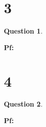 \documentclass{article}
\newtheorem{question}{Question}
\begin{document}
\break

\section*{3}
\begin{myBox}[]{}
    \begin{question}
        
    \end{question}
\end{myBox}

\textbf{Pf:}

\break

\section*{4}
\begin{myBox}[]{}
    \begin{question}
        
    \end{question}
\end{myBox}

\textbf{Pf:}
\end{document}
